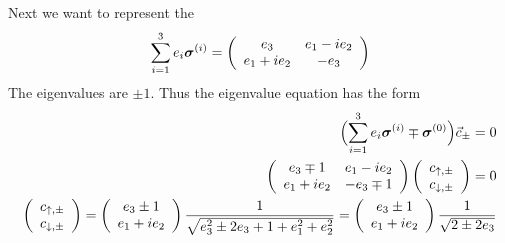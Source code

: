 \documentclass[11pt,a4paper]{report}
\begin{document}
Next we want to represent the 
\begin{eqnarray}
\sum_{i=1}^3 e_i\bm{\sigma}^{(i)}
=\left(\begin{array}{cc}
e_3&e_1-ie_2\\e_1+ie_2&-e_3\end{array}\right)
\end{eqnarray}
The eigenvalues are $\pm 1$. Thus the eigenvalue equation has the form
\begin{eqnarray}
\Bigl(\sum_{i=1}^3 e_i\mat{\sigma}^{(i)}\mp\mat{\sigma}^{(0)}\Bigr)\vec{c}_\pm=0
\nonumber\\
%
\left(\begin{array}{cc}
e_3\mp 1&e_1-ie_2\\e_1+ie_2&-e_3\mp 1\end{array}\right)
\left(\begin{array}{c}
c_{\uparrow,\pm}\\c_{\downarrow,\pm}
\end{array}\right)=0
\nonumber\\
%
\left(\begin{array}{c}
c_{\uparrow,\pm}\\c_{\downarrow,\pm}
\end{array}\right)
=\left(\begin{array}{c}
e_3\pm 1 \\e_1+ie_2
\end{array}\right)\frac{1}{\sqrt{e_3^2\pm2e_3+1+e_1^2+e_2^2}}
=\left(\begin{array}{c}
e_3\pm 1 \\e_1+ie_2
\end{array}\right)
\frac{1}{\sqrt{2\pm2e_3}}
\end{eqnarray}
\end{document}
